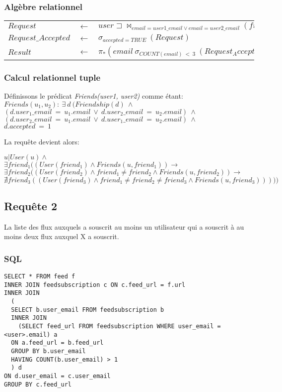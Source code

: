 \documentclass[a4paper,10pt]{article}
\begin{document}
\subsubsection{Algèbre relationnel}
\begin{center}
\begin{tabular}{lll}
$Request$		& $\leftarrow$ & $ user\sqsupset\Join_{email=user1\_email \vee email=user2\_email}( friendship)$\\
$Request\_Accepted$	& $\leftarrow$ & $ \sigma_{accepted=TRUE}\ (Request)$\\
$Result$		& $\leftarrow$ & $ \pi_* (email\ \sigma_{COUNT(email)\ <\ 3}\ (Request_Accepted) )$ 
\end{tabular}
\end{center}

\subsubsection{Calcul relationnel tuple}
Définissons le prédicat \emph{Friends(user1, user2)} comme étant:
\\
      $Friends(u_1, u_2):\ \exists\ d\ (Friendship(d)\ \wedge $\\
      $(d.user_1\_email\ =\ u_1.email\ \vee\ d.user_2\_email\ =\ u_2.email)\ \wedge $\\
      $(d.user_2\_email\ =\ u_1.email\ \vee\ d.user_1\_email\ =\ u_2.email)\ \wedge $\\
      $d.accepted\ =\ 1$

La requête devient alors:

       $u | User(u) \wedge$ \\
       $\exists friend_1 ((User(friend_1) \wedge Friends(u, friend_1)) \rightarrow$ \\
       $\exists friend_2 ((User(friend_2) \wedge friend_1 \neq friend_2 \wedge Friends(u, friend_2)) \rightarrow$ \\
       $\nexists friend_3 ((User(friend_3) \wedge friend_1 \neq friend_2 \neq friend_3 \wedge Friends(u, friend_3)))))$
\clearpage
\subsection{Requête 2}
La liste des flux auxquels a souscrit au moins un utilisateur qui a souscrit à au moins deux flux auxquel X
a souscrit.
\subsubsection{SQL}
\begin{lstlisting}
SELECT * FROM feed f
INNER JOIN feedsubscription c ON c.feed_url = f.url
INNER JOIN 
  (
  SELECT b.user_email FROM feedsubscription b 
  INNER JOIN 
    (SELECT feed_url FROM feedsubscription WHERE user_email = <user>.email) a
  ON a.feed_url = b.feed_url 
  GROUP BY b.user_email
  HAVING COUNT(b.user_email) > 1
  ) d
ON d.user_email = c.user_email
GROUP BY c.feed_url
\end{lstlisting}
\end{document}
